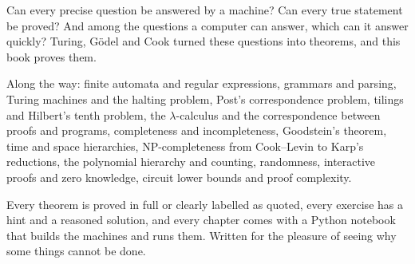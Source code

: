 Can every precise question be answered by a machine? Can every true statement be proved? And among the questions a
computer can answer, which can it answer quickly? Turing, G\"odel and Cook turned these questions into theorems, and
this book proves them.

Along the way: finite automata and regular expressions, grammars and parsing, Turing machines and the halting
problem, Post's correspondence problem, tilings and Hilbert's tenth problem, the $\lambda$-calculus and the
correspondence between proofs and programs, completeness and incompleteness, Goodstein's theorem, time and space
hierarchies, NP-completeness from Cook--Levin to Karp's reductions, the polynomial hierarchy and counting,
randomness, interactive proofs and zero knowledge, circuit lower bounds and proof complexity.

Every theorem is proved in full or clearly labelled as quoted, every exercise has a hint and a reasoned solution, and
every chapter comes with a Python notebook that builds the machines and runs them. Written for the pleasure of
seeing why some things cannot be done.
